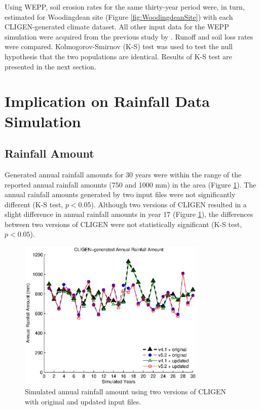 Using WEPP, soil erosion rates for the same thirty-year period were, in turn,
estimated for Woodingdean site (Figure \ref{fig:WoodingdeanSite}) with each
CLIGEN-generated climate dataset. All other input data for the WEPP simulation
were acquired from the previous study by \citet{favis-mortlock1998-141}. Runoff
and soil loss rates were compared.
Kolmogorov-Smirnov (K-S) test was used to test the null hypothesis that the two
populations are identical. Results of K-S test are presented in the next
section.

\section{Implication on Rainfall Data Simulation}
\label{sec:RainfallSimulation}

\subsection{Rainfall Amount}
Generated annual rainfall amounts for 30 years were within the range of the
reported annual rainfall amounts (750 and 1000 mm) in the area (Figure
\ref{fig:cligen_annual_amount}). The annual rainfall amounts generated by two
input files were not significantly different (K-S test, $p<0.05$). Although two
versions of CLIGEN resulted in a slight difference in annual rainfall amounts in
year 17 (Figure \ref{fig:cligen_annual_amount}), the differences between two
versions of CLIGEN were not statistically significant (K-S test, $p<0.05$).

\begin{figure}[htbp]
  \centering
   \includegraphics[width=0.8\textwidth]{./img/cligen_annual_amount_series}
  \caption{Simulated annual rainfall amount using two versions of CLIGEN with
original and updated input files.}
  \label{fig:cligen_annual_amount}
\end{figure}


